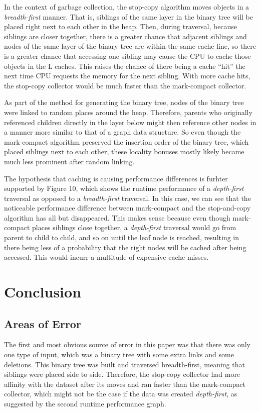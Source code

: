 \documentclass[index]{subfiles}
\begin{document}
In the context of garbage collection, the stop-copy algorithm moves objects in a \textit{breadth-first} manner. That is, siblings of the same layer in the binary tree will be placed right next to each other in the heap. Then, during traversal, because siblings are closer together, there is a greater chance that adjacent siblings and nodes of the same layer of the binary tree are within the same cache line, so there is a greater chance that accessing one sibling may cause the CPU to cache those objects in the L caches. This raises the chance of there being a cache ``hit'' the next time CPU requests the memory for the next sibling. With more cache hits, the stop-copy collector would be much faster than the mark-compact collector. 

As part of the method for generating the binary tree, nodes of the binary tree were linked to random places around the heap. Therefore, parents who originally referenced children directly in the layer below might then reference other nodes in a manner more similar to that of a graph data structure. So even though the mark-compact algorithm preserved the insertion order of the binary tree, which placed siblings next to each other, these locality bonuses mostly likely became much less prominent after random linking.

The hypothesis that caching is causing performance differences is furhter supported by Figure 10, which shows the runtime performance of a \textit{depth-first} traversal as opposed to a \textit{breadth-first} traversal. In this case, we can see that the noticeable performance difference between mark-compact and the stop-and-copy algorithm has all but disappeared. This makes sense because even though mark-compact places siblings close together, a \textit{depth-first} traversal would go from parent to child to child, and so on until the leaf node is reached, resulting in there being less of a probability that the right nodes will be cached after being accessed. This would incurr a multitude of expensive cache misses.

\section{Conclusion}

\subsection{Areas of Error}

The first and most obvious source of error in this paper was that there was only one type of input, which was a binary tree with some extra links and some deletions. This binary tree was built and traversed breadth-first, meaning that siblings were placed side to side. Therefore, the stop-copy collector had more affinity with the dataset after its moves and ran faster than the mark-compact collector, which might not be the case if the data was created \textit{depth-first}, as suggested by the second runtime performance graph.
\end{document}
